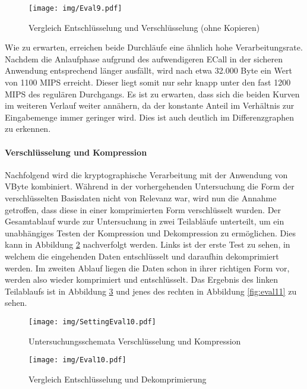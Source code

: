 \begin{figure}[h]
	\texttt{[image: img/Eval9.pdf]}
	\centering
	\caption{Vergleich Entschlüsselung und Verschlüsselung (ohne Kopieren)}
	\label{fig:eval9}
\end{figure}

Wie zu erwarten, erreichen beide Durchläufe eine ähnlich hohe Verarbeitungsrate. Nachdem die Anlaufphase aufgrund des aufwendigeren \ac{ECall} in der sicheren Anwendung entsprechend länger ausfällt, wird nach etwa 32.000 Byte ein Wert von 1100 \ac{MIPS} erreicht. Dieser liegt somit nur sehr knapp unter den fast 1200 \ac{MIPS} des regulären Durchgangs. Es ist zu erwarten, dass sich die beiden Kurven im weiteren Verlauf weiter annähern, da der konstante Anteil im Verhältnis zur Eingabemenge immer geringer wird. Dies ist auch deutlich im Differenzgraphen zu erkennen.

\paragraph{Verschlüsselung und Kompression}

Nachfolgend wird die kryptographische Verarbeitung mit der Anwendung von VByte kombiniert. Während in der vorhergehenden Untersuchung die Form der verschlüsselten Basisdaten nicht von Relevanz war, wird nun die Annahme getroffen, dass diese in einer komprimierten Form verschlüsselt wurden. Der Gesamtablauf wurde zur Untersuchung in zwei Teilabläufe unterteilt, um ein unabhängiges Testen der Kompression und Dekompression zu ermöglichen. Dies kann in Abbildung \ref{fig:settingeval10} nachverfolgt werden. Links ist der erste Test zu sehen, in welchem die eingehenden Daten entschlüsselt und daraufhin dekomprimiert werden. Im zweiten Ablauf liegen die Daten schon in ihrer richtigen Form vor, werden also wieder komprimiert und entschlüsselt. Das Ergebnis des linken Teilablaufs ist in Abbildung \ref{fig:eval10} und jenes des rechten in Abbildung \ref{fig:eval11} zu sehen.

\begin{figure}[h]
	\texttt{[image: img/SettingEval10.pdf]}
	\centering
	\caption{Untersuchungsschemata Verschlüsselung und Kompression}
	\label{fig:settingeval10}
\end{figure}

\begin{figure}[h]
	\texttt{[image: img/Eval10.pdf]}
	\centering
	\caption{Vergleich Entschlüsselung und Dekomprimierung}
	\label{fig:eval10}
\end{figure}

